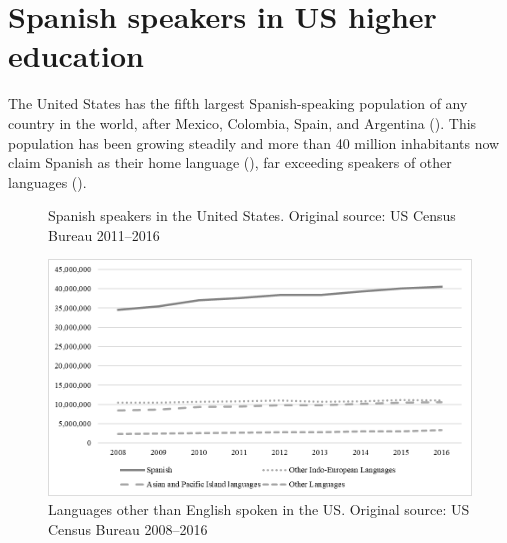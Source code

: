 \documentclass[output=paper]{../langscibook}
\begin{document}
 \section{Spanish speakers in US higher education}


The United States has the fifth largest Spanish-speaking population of any country in the world, after Mexico, Colombia, Spain, and Argentina (\citealt{EscobarPotowski2015}). This population has been growing steadily and more than 40 million inhabitants now claim Spanish as their home language (), far exceeding speakers of other languages ().



\begin{figure}
\footnotesize
\caption{Spanish speakers in the United States. Original source: US Census Bureau 2011--2016\label{fig:3:1}}
\end{figure}

\begin{figure}
  \includegraphics[width=\textwidth]{figures/Chapter3-img002.png}
  \caption{Languages other than English spoken in the US. Original source: US Census Bureau 2008--2016}
  \label{fig:3:2}
\end{figure}
\end{document}
